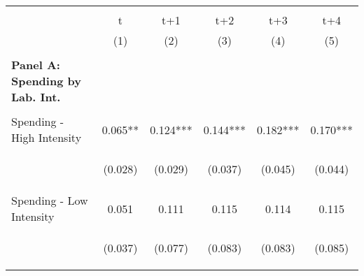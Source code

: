 
    \begin{tabular}{lccccc} \hline
    \vspace{-2pt} & \vspace{-2pt} & \vspace{-2pt} & \vspace{-2pt} & \vspace{-2pt} \\
     
     & t & t+1 & t+2 & t+3 & t+4 \\ 
    & (1) & (2) & (3) & (4) & (5) \\
   \vspace{-2pt} & \vspace{-2pt} & \vspace{-2pt} & \vspace{-2pt} \\
    \hline
   \multicolumn{1}{l}{\textbf{Panel A: Spending by Lab. Int.}} \\ 
    
    \vspace{-2pt} & \vspace{-2pt} & \vspace{-2pt} & \vspace{-2pt} \\
    
    Spending - High Intensity & 0.065** & 0.124*** & 0.144*** & 0.182*** & 0.170*** \\
    & \begin{footnotesize}(0.028)\end{footnotesize} & \begin{footnotesize}(0.029)\end{footnotesize} & \begin{footnotesize}(0.037)\end{footnotesize} & \begin{footnotesize}(0.045)\end{footnotesize} & \begin{footnotesize}(0.044)\end{footnotesize} \\
    Spending - Low Intensity & 0.051 & 0.111 & 0.115 & 0.114 & 0.115 \\
    & \begin{footnotesize}(0.037)\end{footnotesize} & \begin{footnotesize}(0.077)\end{footnotesize} & \begin{footnotesize}(0.083)\end{footnotesize} & \begin{footnotesize}(0.083)\end{footnotesize} & \begin{footnotesize}(0.085)\end{footnotesize} \\
 

\end{tabular}
